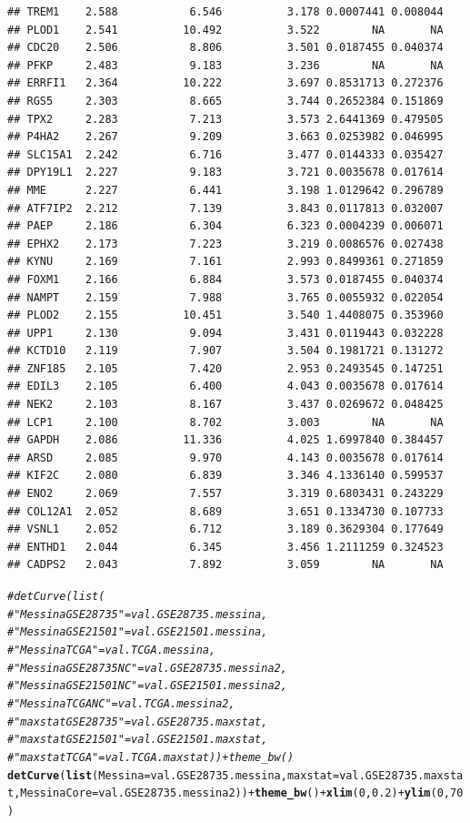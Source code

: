 \documentclass{article}\usepackage[]{graphicx}\usepackage[]{color}
\makeatletter
\newcommand{\hlnum}[1]{\textcolor[rgb]{0.686,0.059,0.569}{#1}}%
\newcommand{\hlcom}[1]{\textcolor[rgb]{0.678,0.584,0.686}{\textit{#1}}}%
\newcommand{\hlopt}[1]{\textcolor[rgb]{0,0,0}{#1}}%
\newcommand{\hlstd}[1]{\textcolor[rgb]{0.345,0.345,0.345}{#1}}%
\newcommand{\hlkwc}[1]{\textcolor[rgb]{0.333,0.667,0.333}{#1}}%
\newcommand{\hlkwd}[1]{\textcolor[rgb]{0.737,0.353,0.396}{\textbf{#1}}}%
\newenvironment{kframe}{%
 \def\at@end@of@kframe{}%
 \ifinner\ifhmode%
  \def\at@end@of@kframe{\end{minipage}}%
  \begin{minipage}{\columnwidth}%
 \fi\fi%
 \def\FrameCommand##1{\hskip\@totalleftmargin \hskip-\fboxsep
 \colorbox{shadecolor}{##1}\hskip-\fboxsep
     \hskip-\linewidth \hskip-\@totalleftmargin \hskip\columnwidth}%
 \MakeFramed {\advance\hsize-\width
   \@totalleftmargin\z@ \linewidth\hsize
   \@setminipage}}%
 {\par\unskip\endMakeFramed%
 \at@end@of@kframe}
\newenvironment{knitrout}{}{} %
\makeatother
\begin{document}
\begin{knitrout}
\begin{kframe}
\begin{verbatim}
## TREM1    2.588           6.546          3.178 0.0007441 0.008044
## PLOD1    2.541          10.492          3.522        NA       NA
## CDC20    2.506           8.806          3.501 0.0187455 0.040374
## PFKP     2.483           9.183          3.236        NA       NA
## ERRFI1   2.364          10.222          3.697 0.8531713 0.272376
## RGS5     2.303           8.665          3.744 0.2652384 0.151869
## TPX2     2.283           7.213          3.573 2.6441369 0.479505
## P4HA2    2.267           9.209          3.663 0.0253982 0.046995
## SLC15A1  2.242           6.716          3.477 0.0144333 0.035427
## DPY19L1  2.227           9.183          3.721 0.0035678 0.017614
## MME      2.227           6.441          3.198 1.0129642 0.296789
## ATF7IP2  2.212           7.139          3.843 0.0117813 0.032007
## PAEP     2.186           6.304          6.323 0.0004239 0.006071
## EPHX2    2.173           7.223          3.219 0.0086576 0.027438
## KYNU     2.169           7.161          2.993 0.8499361 0.271859
## FOXM1    2.166           6.884          3.573 0.0187455 0.040374
## NAMPT    2.159           7.988          3.765 0.0055932 0.022054
## PLOD2    2.155          10.451          3.540 1.4408075 0.353960
## UPP1     2.130           9.094          3.431 0.0119443 0.032228
## KCTD10   2.119           7.907          3.504 0.1981721 0.131272
## ZNF185   2.105           7.420          2.953 0.2493545 0.147251
## EDIL3    2.105           6.400          4.043 0.0035678 0.017614
## NEK2     2.103           8.167          3.437 0.0269672 0.048425
## LCP1     2.100           8.702          3.003        NA       NA
## GAPDH    2.086          11.336          4.025 1.6997840 0.384457
## ARSD     2.085           9.970          4.143 0.0035678 0.017614
## KIF2C    2.080           6.839          3.346 4.1336140 0.599537
## ENO2     2.069           7.557          3.319 0.6803431 0.243229
## COL12A1  2.052           8.689          3.651 0.1334730 0.107733
## VSNL1    2.052           6.712          3.189 0.3629304 0.177649
## ENTHD1   2.044           6.345          3.456 1.2111259 0.324523
## CADPS2   2.043           7.892          3.059        NA       NA
\end{verbatim}
\begin{alltt}
\hlcom{# detCurve(list(}
\hlcom{# 	"Messina GSE28735" = val.GSE28735.messina, }
\hlcom{# 	"Messina GSE21501" = val.GSE21501.messina, }
\hlcom{# 	"Messina TCGA" = val.TCGA.messina, }
\hlcom{# 	"Messina GSE28735 NC" = val.GSE28735.messina2, }
\hlcom{# 	"Messina GSE21501 NC" = val.GSE21501.messina2, }
\hlcom{# 	"Messina TCGA NC" = val.TCGA.messina2, }
\hlcom{# 	"maxstat GSE28735" = val.GSE28735.maxstat, }
\hlcom{# 	"maxstat GSE21501" = val.GSE21501.maxstat, }
\hlcom{# 	"maxstat TCGA" = val.TCGA.maxstat)) + theme_bw()}
\hlkwd{detCurve}\hlstd{(}\hlkwd{list}\hlstd{(}\hlkwc{Messina} \hlstd{= val.GSE28735.messina,} \hlkwc{maxstat} \hlstd{= val.GSE28735.maxstat,} \hlkwc{MessinaCore} \hlstd{= val.GSE28735.messina2))} \hlopt{+} \hlkwd{theme_bw}\hlstd{()} \hlopt{+} \hlkwd{xlim}\hlstd{(}\hlnum{0}\hlstd{,} \hlnum{0.2}\hlstd{)} \hlopt{+} \hlkwd{ylim}\hlstd{(}\hlnum{0}\hlstd{,} \hlnum{70}\hlstd{)}
\end{alltt}



\end{kframe}
\end{knitrout}
\end{document}
